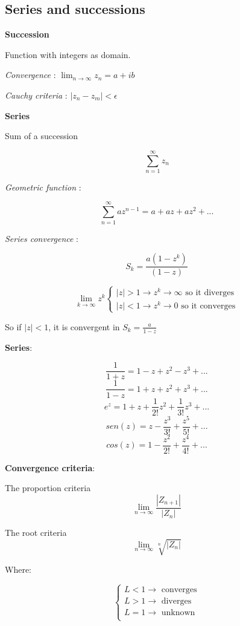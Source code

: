 \documentclass[letterpaper]{article}
\begin{document}
	\begin{multicols}{2}
		\section{Series and successions}
			\textbf{Succession}
			
			Function with integers as domain.
			
			\textit{Convergence} : \(\lim_{n \to \infty} z_n = a + ib\)
			
			\textit{Cauchy criteria} : \(|z_n-z_m| < \epsilon\)
			
			\textbf{Series}
			
			Sum of a succession 
			
			\[\sum_{n=1}^{\infty} {z_n}\]
			
			\textit{Geometric function} : 
			
			\[\sum_{n=1}^{\infty} az^{n-1} = a + az + az^{2} + ...\]
			
			\textit{Series convergence} : 
			
			\[S_k = \frac{a(1-z^{k})}{(1-z)}\]
			
			\[\lim_{k \to \infty} z^k 
				\begin{cases}
					|z| > 1 \to z^{k} \to \infty \text{ so it diverges} \\
					|z| < 1 \to z^{k} \to 0 \text{ so it converges}
				\end{cases}
			\]
			
			So if \(|z| < 1\), it is convergent in \(S_k = \frac{a}{1-z}\)
			
			\textbf{Series}:
			
			\[ \frac{1}{1+z} = 1 - z + z^{2} - z^{3} + ... \]
			\[ \frac{1}{1-z} = 1 + z + z^{2} + z^{3} + ... \]
			\[ e^{z} = 1 + z + \frac{1}{2!} z^{2} + \frac{1}{3!} z^{3} + ... \]
			\[sen(z) = z - \frac{z^{3}}{3!} + \frac{z^{5}}{5!} + ... \]
			\[cos(z) = 1 - \frac{z^{2}}{2!} + \frac{z^{4}}{4!} + ... \]
			
			\textbf{Convergence criteria}:
			
			The proportion criteria
			\[
				\lim_{n \to \infty} \frac{| Z_{n+1} |}{| Z_n |}
			\]
			
			The root criteria
			\[
			\lim_{n \to \infty} \sqrt[n]{|Z_{n}|}
			\]
			
			Where:
			
			\[
			\begin{cases}
				L < 1 \to \text{ converges} \\
				L > 1 \to \text{ diverges} \\
				L = 1 \to \text{ unknown} \\
			\end{cases}
			\]
			

\end{multicols}
\end{document}
